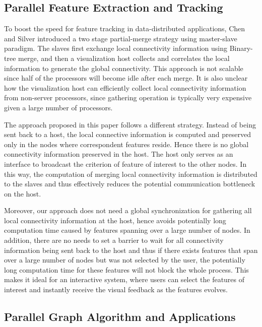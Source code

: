 \documentclass[10pt, conference, compsocconf]{IEEEtran}
\begin{document}
\subsection{Parallel Feature Extraction and Tracking}

To boost the speed for feature tracking in data-distributed applications, Chen and Silver \cite{Chen2003} introduced a two stage partial-merge strategy using master-slave paradigm. The slaves first exchange local connectivity information using Binary-tree merge, and then a visualization host collects and correlates the local information to generate the global connectivity. This approach is not scalable since half of the processors will become idle after each merge. It is also unclear how the visualization host can efficiently collect local connectivity information from non-server processors, since gathering operation is typically very expensive given a large number of processors. 

The approach proposed in this paper follows a different strategy. Instead of being sent back to a host, the local connective information is computed and preserved only in the nodes where correspondent features reside. Hence there is no global connectivity information preserved in the host. The host only serves as an interface to broadcast the criterion of feature of interest to the other nodes. In this way, the computation of merging local connectivity information is distributed to the slaves and thus effectively reduces the potential communication bottleneck on the host.

Moreover, our approach does not need a global synchronization for gathering all local connectivity information at the host, hence avoids potentially long computation time caused by features spanning over a large number of nodes. In addition, there are no needs to set a barrier to wait for all connectivity information being sent back to the host and thus if there exists features that span over a large number of nodes but was not selected by the user, the potentially long computation time for these features will not block the whole process. This makes it ideal for an interactive system, where users can select the features of interest and instantly receive the visual feedback as the features evolves.

\subsection{Parallel Graph Algorithm and Applications}
\end{document}
